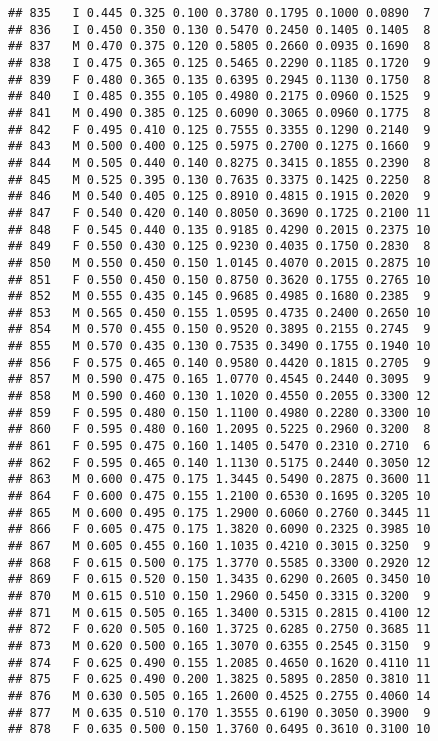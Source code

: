 \documentclass[
]{article}
\begin{document}
\begin{verbatim}
## 835   I 0.445 0.325 0.100 0.3780 0.1795 0.1000 0.0890  7
## 836   I 0.450 0.350 0.130 0.5470 0.2450 0.1405 0.1405  8
## 837   M 0.470 0.375 0.120 0.5805 0.2660 0.0935 0.1690  8
## 838   I 0.475 0.365 0.125 0.5465 0.2290 0.1185 0.1720  9
## 839   F 0.480 0.365 0.135 0.6395 0.2945 0.1130 0.1750  8
## 840   I 0.485 0.355 0.105 0.4980 0.2175 0.0960 0.1525  9
## 841   M 0.490 0.385 0.125 0.6090 0.3065 0.0960 0.1775  8
## 842   F 0.495 0.410 0.125 0.7555 0.3355 0.1290 0.2140  9
## 843   M 0.500 0.400 0.125 0.5975 0.2700 0.1275 0.1660  9
## 844   M 0.505 0.440 0.140 0.8275 0.3415 0.1855 0.2390  8
## 845   M 0.525 0.395 0.130 0.7635 0.3375 0.1425 0.2250  8
## 846   M 0.540 0.405 0.125 0.8910 0.4815 0.1915 0.2020  9
## 847   F 0.540 0.420 0.140 0.8050 0.3690 0.1725 0.2100 11
## 848   F 0.545 0.440 0.135 0.9185 0.4290 0.2015 0.2375 10
## 849   F 0.550 0.430 0.125 0.9230 0.4035 0.1750 0.2830  8
## 850   M 0.550 0.450 0.150 1.0145 0.4070 0.2015 0.2875 10
## 851   F 0.550 0.450 0.150 0.8750 0.3620 0.1755 0.2765 10
## 852   M 0.555 0.435 0.145 0.9685 0.4985 0.1680 0.2385  9
## 853   M 0.565 0.450 0.155 1.0595 0.4735 0.2400 0.2650 10
## 854   M 0.570 0.455 0.150 0.9520 0.3895 0.2155 0.2745  9
## 855   M 0.570 0.435 0.130 0.7535 0.3490 0.1755 0.1940 10
## 856   F 0.575 0.465 0.140 0.9580 0.4420 0.1815 0.2705  9
## 857   M 0.590 0.475 0.165 1.0770 0.4545 0.2440 0.3095  9
## 858   M 0.590 0.460 0.130 1.1020 0.4550 0.2055 0.3300 12
## 859   F 0.595 0.480 0.150 1.1100 0.4980 0.2280 0.3300 10
## 860   F 0.595 0.480 0.160 1.2095 0.5225 0.2960 0.3200  8
## 861   F 0.595 0.475 0.160 1.1405 0.5470 0.2310 0.2710  6
## 862   F 0.595 0.465 0.140 1.1130 0.5175 0.2440 0.3050 12
## 863   M 0.600 0.475 0.175 1.3445 0.5490 0.2875 0.3600 11
## 864   F 0.600 0.475 0.155 1.2100 0.6530 0.1695 0.3205 10
## 865   M 0.600 0.495 0.175 1.2900 0.6060 0.2760 0.3445 11
## 866   F 0.605 0.475 0.175 1.3820 0.6090 0.2325 0.3985 10
## 867   M 0.605 0.455 0.160 1.1035 0.4210 0.3015 0.3250  9
## 868   F 0.615 0.500 0.175 1.3770 0.5585 0.3300 0.2920 12
## 869   F 0.615 0.520 0.150 1.3435 0.6290 0.2605 0.3450 10
## 870   M 0.615 0.510 0.150 1.2960 0.5450 0.3315 0.3200  9
## 871   M 0.615 0.505 0.165 1.3400 0.5315 0.2815 0.4100 12
## 872   F 0.620 0.505 0.160 1.3725 0.6285 0.2750 0.3685 11
## 873   M 0.620 0.500 0.165 1.3070 0.6355 0.2545 0.3150  9
## 874   F 0.625 0.490 0.155 1.2085 0.4650 0.1620 0.4110 11
## 875   F 0.625 0.490 0.200 1.3825 0.5895 0.2850 0.3810 11
## 876   M 0.630 0.505 0.165 1.2600 0.4525 0.2755 0.4060 14
## 877   M 0.635 0.510 0.170 1.3555 0.6190 0.3050 0.3900  9
## 878   F 0.635 0.500 0.150 1.3760 0.6495 0.3610 0.3100 10

\end{verbatim}
\end{document}
